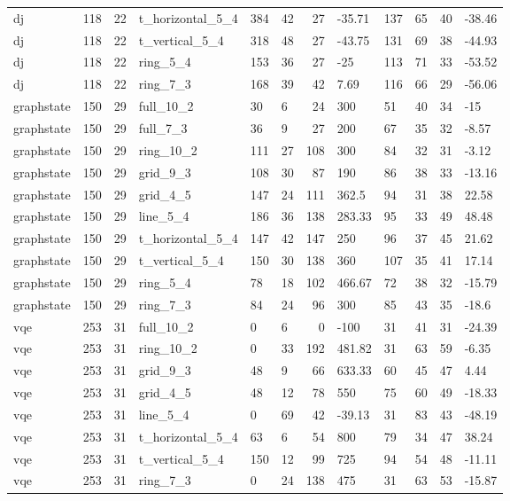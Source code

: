 \begin{longtable}{lrrlllrlllrl}
dj & 118 & 22 & t\_horizontal\_5\_4 & 384 & 42 & 27 & -35.71 & 137 & 65 & 40 & -38.46 \\
dj & 118 & 22 & t\_vertical\_5\_4 & 318 & 48 & 27 & -43.75 & 131 & 69 & 38 & -44.93 \\
dj & 118 & 22 & ring\_5\_4 & 153 & 36 & 27 & -25 & 113 & 71 & 33 & -53.52 \\
dj & 118 & 22 & ring\_7\_3 & 168 & 39 & 42 & 7.69 & 116 & 66 & 29 & -56.06 \\
graphstate & 150 & 29 & full\_10\_2 & 30 & 6 & 24 & 300 & 51 & 40 & 34 & -15 \\
graphstate & 150 & 29 & full\_7\_3 & 36 & 9 & 27 & 200 & 67 & 35 & 32 & -8.57 \\
graphstate & 150 & 29 & ring\_10\_2 & 111 & 27 & 108 & 300 & 84 & 32 & 31 & -3.12 \\
graphstate & 150 & 29 & grid\_9\_3 & 108 & 30 & 87 & 190 & 86 & 38 & 33 & -13.16 \\
graphstate & 150 & 29 & grid\_4\_5 & 147 & 24 & 111 & 362.5 & 94 & 31 & 38 & 22.58 \\
graphstate & 150 & 29 & line\_5\_4 & 186 & 36 & 138 & 283.33 & 95 & 33 & 49 & 48.48 \\
graphstate & 150 & 29 & t\_horizontal\_5\_4 & 147 & 42 & 147 & 250 & 96 & 37 & 45 & 21.62 \\
graphstate & 150 & 29 & t\_vertical\_5\_4 & 150 & 30 & 138 & 360 & 107 & 35 & 41 & 17.14 \\
graphstate & 150 & 29 & ring\_5\_4 & 78 & 18 & 102 & 466.67 & 72 & 38 & 32 & -15.79 \\
graphstate & 150 & 29 & ring\_7\_3 & 84 & 24 & 96 & 300 & 85 & 43 & 35 & -18.6 \\
vqe & 253 & 31 & full\_10\_2 & 0 & 6 & 0 & -100 & 31 & 41 & 31 & -24.39 \\
vqe & 253 & 31 & ring\_10\_2 & 0 & 33 & 192 & 481.82 & 31 & 63 & 59 & -6.35 \\
vqe & 253 & 31 & grid\_9\_3 & 48 & 9 & 66 & 633.33 & 60 & 45 & 47 & 4.44 \\
vqe & 253 & 31 & grid\_4\_5 & 48 & 12 & 78 & 550 & 75 & 60 & 49 & -18.33 \\
vqe & 253 & 31 & line\_5\_4 & 0 & 69 & 42 & -39.13 & 31 & 83 & 43 & -48.19 \\
vqe & 253 & 31 & t\_horizontal\_5\_4 & 63 & 6 & 54 & 800 & 79 & 34 & 47 & 38.24 \\
vqe & 253 & 31 & t\_vertical\_5\_4 & 150 & 12 & 99 & 725 & 94 & 54 & 48 & -11.11 \\
vqe & 253 & 31 & ring\_7\_3 & 0 & 24 & 138 & 475 & 31 & 63 & 53 & -15.87 \\

\end{longtable}

